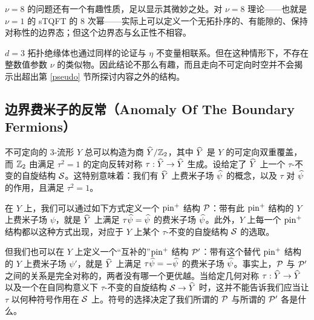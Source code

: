 
$\nu=8$ 的问题还有一个有趣性质，足以显示其微妙之处。对 $\nu=8$ 理论——也就是 $\nu=1$ 的 sTQFT 的 8 次幂——实际上可以定义一个无拓扑序的、有能隙的、保持对称性的边界态；但这个边界态与幺正性不相容。


$d=3$ 拓扑绝缘体也通过同样的论证与 $\eta$ 不变量相联系。但在这种情形下，不存在整数值参数 $\nu$ 的类似物。因此结论不那么有趣，而且走向不可定向时空并不会揭示出超出第 \ref{pseudo} 节所探讨内容之外的结构。

\subsection{边界费米子的反常（Anomaly Of The Boundary Fermions）}\label{anombo}

不可定向的 3-流形 $Y$ 总可以构造为商 $\h Y/\Z_2$，其中 $\h Y$ 是 $Y$ 的可定向双重覆盖，而 $\Z_2$ 由满足 $\tau^2=1$ 的定向反转对称 $\tau:\h Y\to \h Y$ 生成。设给定了 $\h Y$ 上一个 $\tau$-不变的自旋结构 $\S$。这特别意味着：我们有 $\h Y$ 上费米子场 $\h\psi$ 的概念，以及 $\tau$ 对 $\h\psi$ 的作用，且满足 $\tau^2=1$。

在 $Y$ 上，我们可以通过如下方式定义一个 $\pin^+$ 结构 $\P$：带有此 $\pin^+$ 结构的 $Y$ 上费米子场 $\psi$，就是 $\h Y$ 上满足 $\tau\h\psi=\h\psi$ 的费米子场 $\h\psi$。此外，$Y$ 上每一个 $\pin^+$ 结构都以这种方式出现，对应于 $Y$ 上某个 $\tau$-不变的自旋结构 $\S$ 的选取。


但我们也可以在 $Y$ 上定义一个“互补的”$\pin^+$ 结构 $\P'$：带有这个替代 $\pin^+$ 结构的 $Y$ 上费米子场 $\psi'$，就是 $\h Y$ 上满足 $\tau\h\psi=-\h\psi$ 的费米子场 $\h\psi$。事实上，$\P$ 与 $\P'$ 之间的关系是完全对称的，两者没有哪一个更优越。当给定几何对称 $\tau:\h Y\to \h Y$ 以及一个在自同构意义下 $\tau$-不变的自旋结构 $\S\to \h Y$ 时，这并不能告诉我们应当让 $\tau$ 以何种符号作用在 $\S$ 上。符号的选择决定了我们所谓的 $\P$ 与所谓的 $\P'$ 各是什么。

